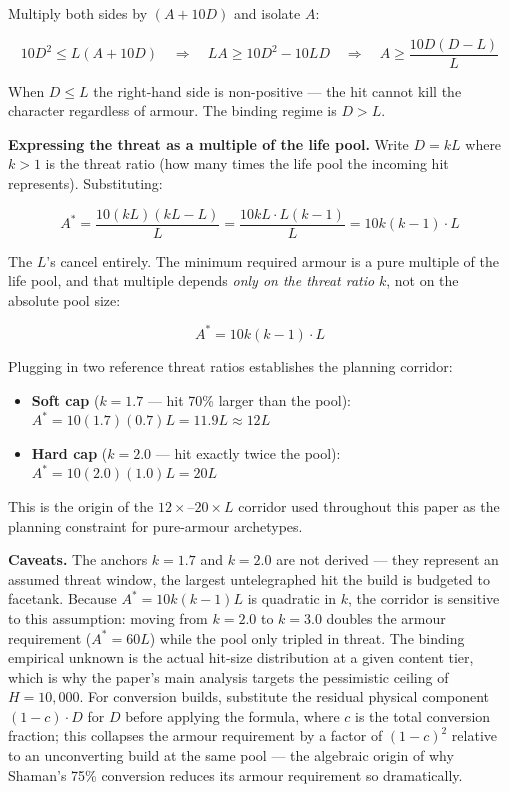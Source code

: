 \documentclass[12pt, letterpaper]{article}
\begin{document}
Multiply both sides by $(A + 10D)$ and isolate $A$:

\[
10D^2 \leq L(A + 10D) \quad \Rightarrow \quad LA \geq 10D^2 - 10LD \quad \Rightarrow \quad A \geq \frac{10D(D - L)}{L}
\]

When $D \leq L$ the right-hand side is non-positive --- the hit cannot kill the character regardless of armour. The binding regime is $D > L$.

\textbf{Expressing the threat as a multiple of the life pool.} Write $D = kL$ where $k > 1$ is the threat ratio (how many times the life pool the incoming hit represents). Substituting:

\[
A^* = \frac{10(kL)(kL - L)}{L} = \frac{10kL \cdot L(k-1)}{L} = 10k(k-1) \cdot L
\]

The $L$'s cancel entirely. The minimum required armour is a pure multiple of the life pool, and that multiple depends \textit{only on the threat ratio} $k$, not on the absolute pool size:

\[
\boxed{A^* = 10k(k-1) \cdot L}
\]

Plugging in two reference threat ratios establishes the planning corridor:

\begin{itemize}
    \item \textbf{Soft cap} ($k = 1.7$ --- hit 70\% larger than the pool): $A^* = 10(1.7)(0.7)L = 11.9L \approx 12L$
    \item \textbf{Hard cap} ($k = 2.0$ --- hit exactly twice the pool): $A^* = 10(2.0)(1.0)L = 20L$
\end{itemize}

This is the origin of the $12\times$--$20\times L$ corridor used throughout this paper as the planning constraint for pure-armour archetypes.

\textbf{Caveats.} The anchors $k = 1.7$ and $k = 2.0$ are not derived --- they represent an assumed threat window, the largest untelegraphed hit the build is budgeted to facetank. Because $A^* = 10k(k-1)L$ is quadratic in $k$, the corridor is sensitive to this assumption: moving from $k = 2.0$ to $k = 3.0$ doubles the armour requirement ($A^* = 60L$) while the pool only tripled in threat. The binding empirical unknown is the actual hit-size distribution at a given content tier, which is why the paper's main analysis targets the pessimistic ceiling of $H = 10{,}000$. For conversion builds, substitute the residual physical component $(1 - c) \cdot D$ for $D$ before applying the formula, where $c$ is the total conversion fraction; this collapses the armour requirement by a factor of $(1-c)^2$ relative to an unconverting build at the same pool --- the algebraic origin of why Shaman's 75\% conversion reduces its armour requirement so dramatically.
\end{document}
